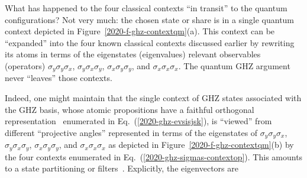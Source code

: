 \documentclass[sn-mathphys]{sn-jnl}%
\theoremstyle{thmstyleone}%
\theoremstyle{thmstyletwo}%
\theoremstyle{thmstylethree}%
\begin{document}
What has happened to the four classical contexts ``in transit'' to the quantum configurations?
Not very much: the chosen state or share is in a single quantum context
depicted in Figure~\ref{2020-f-ghz-contextqm}(a).
This context can be ``expanded'' into the four known classical contexts discussed earlier by rewriting its atoms
in terms of the eigenstates (eigenvalues) relevant observables (operators)
$\sigma_y \sigma_y \sigma_x$,
$\sigma_y \sigma_x \sigma_y$,
$\sigma_x \sigma_y \sigma_y$, and
$\sigma_x \sigma_x \sigma_x$.
The quantum GHZ argument never ``leaves'' those contexts.

Indeed, one might maintain that the single context of GHZ states associated with the GHZ basis, whose atomic propositions
have a faithful orthogonal representation~\cite{lovasz-79,lovasz-89,Grtschel1993,Portillo-2015}
enumerated in Eq.~(\ref{2020-ghz-evsisjsk}), is ``viewed'' from different ``projective angles''
represented in terms of the eigenstates of $\sigma_y \sigma_y \sigma_x$, $\sigma_y \sigma_x \sigma_y$, $\sigma_x \sigma_y \sigma_y$,  and $\sigma_x \sigma_x \sigma_x$
as depicted in Figure~\ref{2020-f-ghz-contextqm}(b)
by the four contexts enumerated in Eq.~(\ref{2020-ghz-sigmas-contextop}).
This amounts to a state partitioning or filters~\cite{DonSvo01,svozil-2002-statepart-prl,svozil-2005-ko}.
Explicitly, the eigenvectors are
\end{document}

